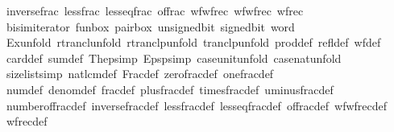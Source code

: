 \begin{isabellebody}
\ \ inverse{\isacharunderscore}{\kern0pt}frac\ less{\isacharunderscore}{\kern0pt}frac\ less{\isacharunderscore}{\kern0pt}eq{\isacharunderscore}{\kern0pt}frac\ of{\isacharunderscore}{\kern0pt}frac\ wf{\isacharunderscore}{\kern0pt}wfrec\ wf{\isacharunderscore}{\kern0pt}wfrec\ wfrec{\isacharprime}{\kern0pt}\isanewline
\isanewline
{}\isamarkupfalse%
\ {\isacharparenleft}{\kern0pt}\ bisim{\isacharunderscore}{\kern0pt}iterator\ fun{\isacharunderscore}{\kern0pt}box\ pair{\isacharunderscore}{\kern0pt}box\ unsigned{\isacharunderscore}{\kern0pt}bit\ signed{\isacharunderscore}{\kern0pt}bit\ word\isanewline
\isanewline
{}\isamarkupfalse%
\ {\isacharparenleft}{\kern0pt}\ Ex{}{\isacharunderscore}{\kern0pt}unfold\ rtrancl{\isacharunderscore}{\kern0pt}unfold\ rtranclp{\isacharunderscore}{\kern0pt}unfold\ tranclp{\isacharunderscore}{\kern0pt}unfold\ prod{\isacharunderscore}{\kern0pt}def\ refl{\isacharprime}{\kern0pt}{\isacharunderscore}{\kern0pt}def\ wf{\isacharprime}{\kern0pt}{\isacharunderscore}{\kern0pt}def\isanewline
\ \ card{\isacharprime}{\kern0pt}{\isacharunderscore}{\kern0pt}def\ sum{\isacharprime}{\kern0pt}{\isacharunderscore}{\kern0pt}def\ The{\isacharunderscore}{\kern0pt}psimp\ Eps{\isacharunderscore}{\kern0pt}psimp\ case{\isacharunderscore}{\kern0pt}unit{\isacharunderscore}{\kern0pt}unfold\ case{\isacharunderscore}{\kern0pt}nat{\isacharunderscore}{\kern0pt}unfold\isanewline
\ \ size{\isacharunderscore}{\kern0pt}list{\isacharunderscore}{\kern0pt}simp\ nat{\isacharunderscore}{\kern0pt}lcm{\isacharunderscore}{\kern0pt}def\ Frac{\isacharunderscore}{\kern0pt}def\ zero{\isacharunderscore}{\kern0pt}frac{\isacharunderscore}{\kern0pt}def\ one{\isacharunderscore}{\kern0pt}frac{\isacharunderscore}{\kern0pt}def\isanewline
\ \ num{\isacharunderscore}{\kern0pt}def\ denom{\isacharunderscore}{\kern0pt}def\ frac{\isacharunderscore}{\kern0pt}def\ plus{\isacharunderscore}{\kern0pt}frac{\isacharunderscore}{\kern0pt}def\ times{\isacharunderscore}{\kern0pt}frac{\isacharunderscore}{\kern0pt}def\ uminus{\isacharunderscore}{\kern0pt}frac{\isacharunderscore}{\kern0pt}def\isanewline
\ \ number{\isacharunderscore}{\kern0pt}of{\isacharunderscore}{\kern0pt}frac{\isacharunderscore}{\kern0pt}def\ inverse{\isacharunderscore}{\kern0pt}frac{\isacharunderscore}{\kern0pt}def\ less{\isacharunderscore}{\kern0pt}frac{\isacharunderscore}{\kern0pt}def\ less{\isacharunderscore}{\kern0pt}eq{\isacharunderscore}{\kern0pt}frac{\isacharunderscore}{\kern0pt}def\ of{\isacharunderscore}{\kern0pt}frac{\isacharunderscore}{\kern0pt}def\ wf{\isacharunderscore}{\kern0pt}wfrec{\isacharprime}{\kern0pt}{\isacharunderscore}{\kern0pt}def\isanewline
\ \ wfrec{\isacharprime}{\kern0pt}{\isacharunderscore}{\kern0pt}def\isanewline
%
\isadelimtheory
\isanewline
%
\endisadelimtheory
%
\isatagtheory
{}\isamarkupfalse%
%
\endisatagtheory
{\isafoldtheory}%
%
\isadelimtheory
%
\endisadelimtheory
%
\end{isabellebody}%
